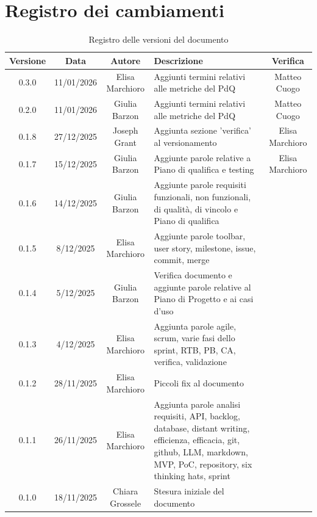 \documentclass[11pt,a4paper]{article}
\begin{document}
\section*{Registro dei cambiamenti}

\begin{table}[H]
    \centering
    \begin{tabular}{|c|c|c|>{\raggedright\arraybackslash}p{}|c|}
        \hline
        \textbf{Versione} & \textbf{Data} & \textbf{Autore} & \textbf{Descrizione} & \textbf{Verifica} \\
        \hline
        0.3.0 & 11/01/2026 & Elisa Marchioro & Aggiunti termini relativi alle metriche del PdQ & Matteo Cuogo \\
        \hline
        0.2.0 & 11/01/2026 & Giulia Barzon & Aggiunti termini relativi alle metriche del PdQ &  Matteo Cuogo\\
        \hline
        0.1.8 & 27/12/2025 & Joseph Grant & Aggiunta sezione 'verifica' al versionamento & Elisa Marchioro\\
        \hline
        0.1.7 & 15/12/2025 & Giulia Barzon & Aggiunte parole relative a Piano di qualifica e testing & Elisa Marchioro\\
        \hline
        0.1.6 & 14/12/2025 & Giulia Barzon & Aggiunte parole requisiti funzionali, non funzionali, di qualità, di vincolo e Piano di qualifica & \\
        \hline
        0.1.5 & 8/12/2025 & Elisa Marchioro & Aggiunte parole toolbar, user story, milestone, issue, commit, merge & \\
        \hline
        0.1.4 & 5/12/2025 & Giulia Barzon & Verifica documento e aggiunte parole relative al Piano di Progetto e ai casi d'uso & \\
        \hline
        0.1.3 & 4/12/2025 & Elisa Marchioro & Aggiunta parole agile, scrum, varie fasi dello sprint, RTB, PB, CA, verifica, validazione & \\
        \hline
        0.1.2 & 28/11/2025 & Elisa Marchioro & Piccoli fix al documento & \\
        \hline
        0.1.1 & 26/11/2025 & Elisa Marchioro & Aggiunta parole analisi requisiti, API, backlog, database, distant writing, efficienza, efficacia, git, github, LLM, markdown, MVP, PoC, repository, six thinking hats, sprint & \\
        \hline
        0.1.0 & 18/11/2025 & Chiara Grossele & Stesura iniziale del documento & \\
        \hline
    \end{tabular}
    \caption{Registro delle versioni del documento}
    \label{tab:versionamento}
\end{table}
\end{document}
